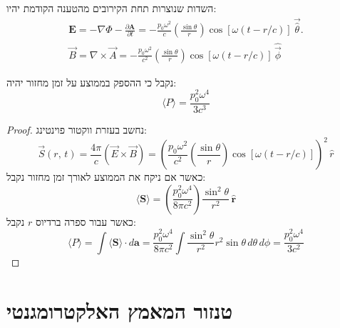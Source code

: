\documentclass{tstextbook}
\begin{document}
\begin{corollary}
השדות שנוצרות תחת הקירובים מהטענה הקודמת יהיו:
\begin{gather*}\mathbf{E}=-\nabla \Phi-{\frac{\partial\mathbf{A}}{\partial t}}=-{\frac{p_{0}\omega^{2}}{c}}\left({\frac{\sin\theta}{r}}\right)\cos\left[ \omega(t-r/c) \right]\,{\vec{\hat{\theta}}}. \\{\vec B}={\nabla\times{\vec A}}=-\frac{p_{0}\omega^{2}}{ c^{2}}\left(\frac{\sin\theta}{r}\right)\cos\left[ \omega(t-r/c) \right]\,{\hat{\vec{\phi}}}
\end{gather*}

\end{corollary}
\begin{proposition}
נקבל כי ההספק בממוצע על זמן מחזור יהיה:
$$\langle P \rangle =\frac{p_{0}^{2}\omega^{4}}{3c^{3}}$$

\end{proposition}
\begin{proof}
נחשב בעזרת ווקטור פוינטינג:
$${\vec S\left( r,\,t \right)}=\frac{4\pi}{c}\left( {\vec E\times \vec B} \right)=\left(\frac{p_{0}\omega^{2}}{c^{2}}\left(\frac{\sin\theta}{r}\right)\cos\left[ \omega(t-r/c) \right]\right)^{2}\,{\hat{r}}$$
כאשר אם ניקח את הממוצע לאורך זמן מחזור נקבל:
$$\langle\mathbf{S}\rangle=\left({\frac{p_{0}^{2}\omega^{4}}{8\pi c^{2}}}\right){\frac{\sin^{2}\theta}{r^{2}}}\,\mathbf{\hat{r}}$$
כאשר עבור ספרה ברדיוס \(r\) נקבל:
$$\langle P\rangle=\int\langle\mathbf{S}\rangle\cdot d\mathbf{a}={\frac{p_{0}^{2}\omega^{4}}{8\pi c^{2}}}\int{\frac{\sin^{2}\theta}{r^{2}}}r^{2}\sin\theta\,d\theta\,d\phi={\frac{p_{0}^{2}\omega^{4}}{3 c^{2}}}$$

\end{proof}
\section{טנזור המאמץ האלקטרומגנטי}
\end{document}
